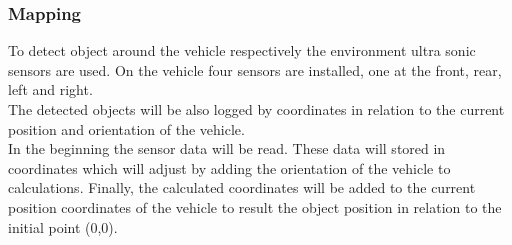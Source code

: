 \subsubsection{Mapping}

To detect object around the vehicle respectively the environment ultra sonic sensors are used. On the vehicle four sensors are installed, one at the front, rear, left and right.\\
The detected objects will be also logged by coordinates in relation to the current position and orientation of the vehicle.\\
In the beginning the sensor data will be read. These data will stored in coordinates which will adjust by adding the orientation of the vehicle to calculations. Finally, the calculated coordinates will be added to the current position coordinates of the vehicle to result the object position in relation to the initial point (0,0).

